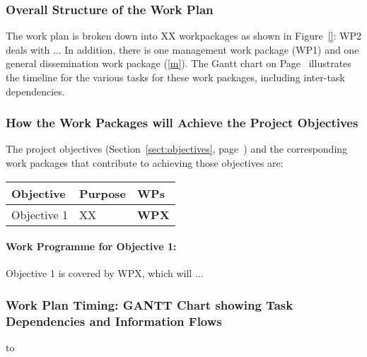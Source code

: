 \documentclass[a4paper,11pt]{article}
\begin{document}
\subsubsection*{Overall Structure of the Work Plan}

The work plan is broken down into XX workpackages as shown
in Figure~\ref{}: WP2 deals with  ...
In addition, there is one management work package (WP1) and one
general dissemination work package (\ref{m}). The Gantt chart on
Page~\pageref{fig:gantt} illustrates the timeline for the
various tasks for these work packages, including inter-task
dependencies.

\subsubsection*{How the Work Packages will Achieve the Project Objectives}
\label{sssec:how_the_work_packages_will_achieve}


The project objectives (Section~\ref{sect:objectives},
page~\pageref{sect:objectives}) and the corresponding work
packages that contribute to achieving those objectives are:

\begin{center}
\begin{tabular}{|l|l|l|}\hline
\textbf{Objective} & \textbf{Purpose} & \textbf{WPs} \\\hline \hline
Objective 1 & XX & \textbf{WPX} \\\hline
\end{tabular}
\end{center}

\paragraph*{Work Programme for Objective 1: }

Objective 1 is covered by WPX, which will ...

\landscape

\subsubsection*{Work Plan Timing: GANTT Chart showing Task Dependencies and Information Flows}


\vspace{-0.7in} \centerline{\hbox to \columnwidth{\hss%
\hss}}
\label{fig:gantt}
\vspace{-1in} %
\endlandscape
\end{document}

